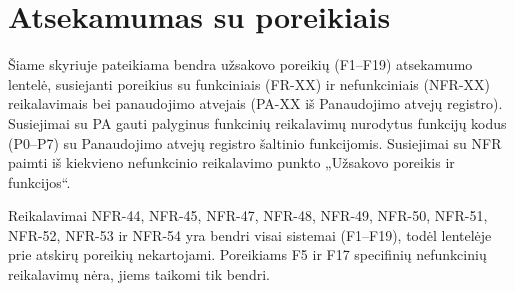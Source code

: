 \section{Atsekamumas su poreikiais}

Šiame skyriuje pateikiama bendra užsakovo poreikių (F1--F19) atsekamumo lentelė, susiejanti poreikius su funkciniais (FR-XX) ir nefunkciniais (NFR-XX) reikalavimais bei panaudojimo atvejais (PA-XX iš Panaudojimo atvejų registro). Susiejimai su PA gauti palyginus funkcinių reikalavimų nurodytus funkcijų kodus (P0--P7) su Panaudojimo atvejų registro šaltinio funkcijomis. Susiejimai su NFR paimti iš kiekvieno nefunkcinio reikalavimo punkto „Užsakovo poreikis ir funkcijos“.

Reikalavimai NFR-44, NFR-45, NFR-47, NFR-48, NFR-49, NFR-50, NFR-51, NFR-52, NFR-53 ir NFR-54 yra bendri visai sistemai (F1--F19), todėl lentelėje prie atskirų poreikių nekartojami. Poreikiams F5 ir F17 specifinių nefunkcinių reikalavimų nėra, jiems taikomi tik bendri.

